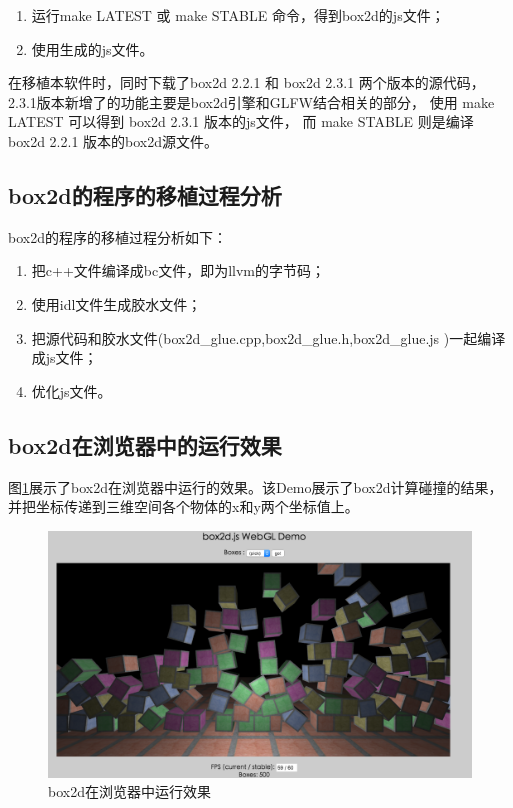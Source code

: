 \begin{enumerate}[itemindent=2em]
\begin{verbatim}
box2d_glue.h: box2d_glue.cpp

box2d.js: box2d.bc box2d_glue.cpp box2d_glue.h
	$(CXX) $(LINK_OPTS) -I$(ACTIVE) -s EXPORT_BINDINGS=1 -s 
	RESERVED_FUNCTION_POINTERS=20 --post-js box2d_glue.js 
	--memory-init-file 0 -s NO_EXIT_RUNTIME=1 
	glue_stub.cpp $< -o build/$(ACTIVE)_$(BUILD).js

clean: remove
	rm -f $(OBJECTS)
	
remove:
	rm -f box2d.bc box2d_bindings.cpp box2d_bindings.bc box2d.clean.h box2d_glue.js box2d_glue.cpp WebIDLGrammar.pkl parser.out
\end{verbatim}    	
	\item 运行make LATEST 或 make STABLE 命令，得到box2d的js文件；
	\item 使用生成的js文件。
\end{enumerate}

在移植本软件时，同时下载了box2d 2.2.1 和 box2d 2.3.1 两个版本的源代码，
2.3.1版本新增了的功能主要是box2d引擎和GLFW结合相关的部分，
使用 make LATEST 可以得到 box2d 2.3.1 版本的js文件，
而 make STABLE 则是编译 box2d 2.2.1 版本的box2d源文件。

\subsection{box2d的程序的移植过程分析}

box2d的程序的移植过程分析如下：

\begin{enumerate}[itemindent=2em]
    \item 把c++文件编译成bc文件，即为llvm的字节码；
    \item 使用idl文件生成胶水文件；
    \item 把源代码和胶水文件(box2d\_glue.cpp,box2d\_glue.h,box2d\_glue.js )一起编译成js文件；
	\item 优化js文件。
\end{enumerate}

\subsection{box2d在浏览器中的运行效果}

图\ref{box2d-html}展示了box2d在浏览器中运行的效果。该Demo展示了box2d计算碰撞的结果，并把坐标传递到三维空间各个物体的x和y两个坐标值上。

\newpage

\begin{figure}[h!] %
    \centering
    \includegraphics[width=450bp]{figure/pic/box2d-sample-html.png}
    \caption{box2d在浏览器中运行效果}
    \label{box2d-html}
\end{figure}

